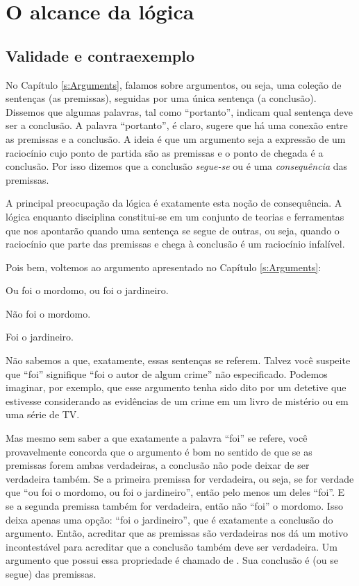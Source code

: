 \chapter{O alcance da lógica}
\label{s:Valid}

\section{Validade e contraexemplo}
No Capítulo \ref{s:Arguments}, falamos sobre argumentos, ou seja, uma coleção de sentenças (as premissas), seguidas por uma única sentença (a conclusão).
Dissemos que algumas palavras, tal como ``portanto'', indicam qual sentença deve ser a conclusão.
A palavra ``portanto'', é claro, sugere que há uma conexão entre as premissas e a conclusão.
A ideia é que um argumento seja a expressão de um raciocínio cujo ponto de partida são as premissas e o ponto de chegada é a conclusão.
Por isso dizemos que a conclusão \emph{segue-se} ou é uma \emph{consequência} das premissas.

A principal preocupação da lógica é exatamente esta noção de consequência.
A lógica enquanto disciplina constitui-se em um conjunto de teorias e ferramentas que nos apontarão quando uma sentença se segue de outras, ou seja, quando o raciocínio que parte das premissas e chega à conclusão é um raciocínio infalível.

Pois bem, voltemos ao argumento apresentado no Capítulo \ref{s:Arguments}: 

	\begin{earg}
		\item[] Ou foi o mordomo, ou foi o jardineiro.
		\item[] Não foi o mordomo.
		\item[\therefore] Foi o jardineiro.
	\end{earg}
Não sabemos a que, exatamente, essas sentenças se referem.
Talvez você suspeite que ``foi'' signifique ``foi o autor de algum crime'' não especificado.
Podemos imaginar, por exemplo, que esse argumento tenha sido dito por um detetive que estivesse considerando as evidências de um crime em um livro de mistério ou em uma série de TV.

Mas mesmo sem saber a que exatamente a palavra ``foi'' se refere, você provavelmente concorda que o argumento é bom no sentido de que  se as premissas forem ambas verdadeiras, a conclusão não pode deixar de ser verdadeira também.
Se a primeira premissa for verdadeira, ou seja, se for verdade que ``ou foi o mordomo, ou foi o jardineiro'', então pelo menos um deles ``foi''.
E se a segunda premissa também for verdadeira, então não ``foi'' o mordomo.
Isso deixa apenas uma opção: ``foi o jardineiro'', que é exatamente a conclusão do argumento.
Então, acreditar que as premissas são verdadeiras nos dá um motivo incontestável para acreditar que a conclusão também deve ser verdadeira.
Um argumento que possui essa propriedade é chamado de .
Sua conclusão é  (ou se segue) das premissas.

